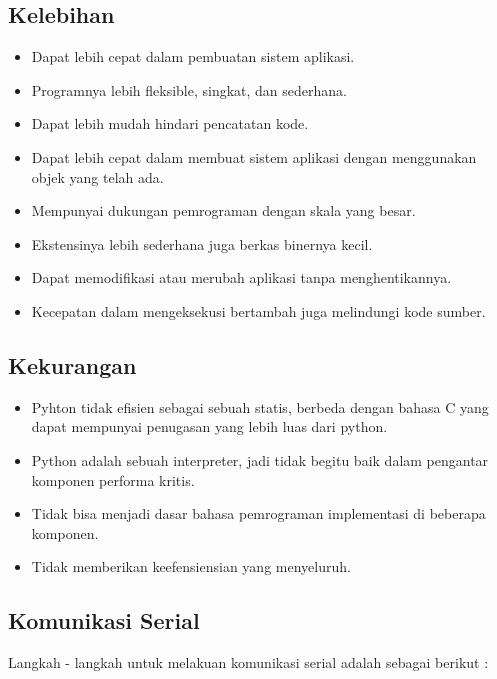 	\subsection{Kelebihan}
		\begin{itemize}
			\item Dapat lebih cepat dalam pembuatan sistem aplikasi.
			\item Programnya lebih fleksible, singkat, dan sederhana.
			\item Dapat lebih mudah hindari pencatatan kode.
			\item Dapat lebih cepat dalam membuat sistem aplikasi dengan menggunakan objek yang telah ada.
			\item Mempunyai dukungan pemrograman dengan skala yang besar.
			\item Ekstensinya lebih sederhana juga berkas binernya kecil.
			\item Dapat memodifikasi atau merubah aplikasi tanpa menghentikannya.
			\item Kecepatan dalam mengeksekusi bertambah juga melindungi kode sumber.
		\end{itemize}
		
	\subsection{Kekurangan}
		\begin{itemize}
			\item Pyhton tidak efisien sebagai sebuah statis, berbeda dengan bahasa C yang dapat mempunyai penugasan yang lebih luas dari python.
			\item Python adalah sebuah interpreter, jadi tidak begitu baik dalam pengantar komponen performa kritis.
			\item Tidak bisa menjadi dasar bahasa pemrograman implementasi di beberapa komponen.
			\item Tidak memberikan keefensiensian yang menyeluruh.
		\end{itemize}
		
	\subsection{Komunikasi Serial}
		Langkah - langkah untuk melakuan komunikasi serial adalah sebagai berikut :
		
